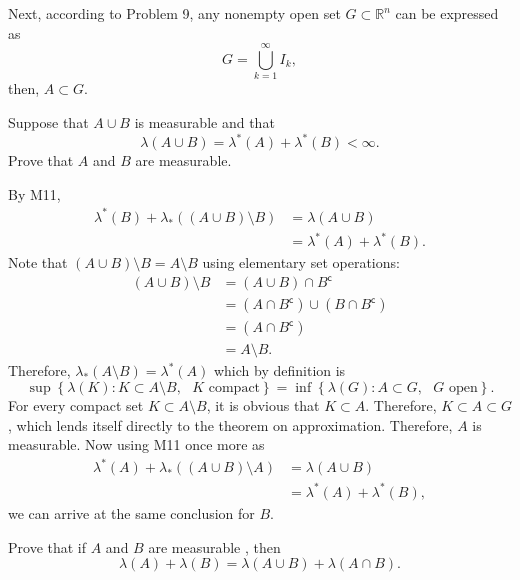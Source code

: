 \documentclass[answers]{exam}
\begin{document}
\begin{questions}
\begin{solution}
$$   $$
   Next, according to Problem 9, any nonempty open set $G \subset \mathbb{R}^{n}$ can be expressed as
   $$
   G = \bigcup_{k=1}^{\infty}I_{k},
   $$
   then, $A \subset G$. 
   \end{solution}
   \question
   Suppose that $A \cup B$ is measurable and that
   $$
   \lambda\left(A\cup B\right) = \lambda^{*}\left(A\right) + \lambda^{*}\left(B\right) < \infty.
   $$
   Prove that $A$ and $B$ are measurable.
   \begin{solution}
   By M11,
   \begin{align*}
   \lambda^{*}\left(B\right) + \lambda_{*}\left(\left(A\cup B\right)\setminus B\right) &= \lambda\left(A\cup B\right)\\
   &= \lambda^{*}\left(A\right) + \lambda^{*}\left(B\right).
   \end{align*}
   Note that $\left(A\cup B\right)\setminus B = A\setminus B$ using elementary set operations:
   \begin{align*}
      \left(A\cup B\right)\setminus B &= \left(A \cup B\right) \cap B^{\mathsf{c}}\\
      &= \left(A \cap B^{\mathsf{c}}\right) \cup \left(B \cap B^{\mathsf{c}}\right)\\
      &= \left(A \cap B^{\mathsf{c}}\right)\\
      &= A \setminus B.
   \end{align*}
   Therefore, $\lambda_{*}\left(A\setminus B\right) = \lambda^{*}\left(A\right)$ which by definition is
   $$
      \sup \left\{\lambda\left(K\right): K\subset A\setminus B, \text{ $K$ compact} \right\} = \inf\left\{\lambda\left(G\right): A \subset G, \text{ $G$ open} \right\}.
   $$
   For every compact set $K\subset A\setminus B$, it is obvious that $K \subset A$. Therefore, $K \subset A \subset G$, which lends itself directly to the theorem on approximation. Therefore, $A$ is measurable. Now using M11 once more as
   \begin{align*}
   \lambda^{*}\left(A\right) + \lambda_{*}\left(\left(A \cup B\right)\setminus A\right) &= \lambda\left(A \cup B\right)\\
   &= \lambda^{*}\left(A\right) + \lambda^{*}\left(B\right),
   \end{align*}
   we can arrive at the same conclusion for $B$.
   \end{solution}
   \question
   Prove that if $A$ and $B$ are measurable , then
   $$
   \lambda\left(A\right) + \lambda\left(B\right) = \lambda\left(A\cup B\right) + \lambda\left(A\cap B\right).
   $$
   \begin{solution}

\end{solution}
\end{questions}
\end{document}
